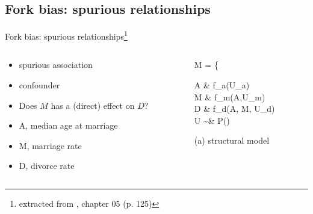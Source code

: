 \subsection{Fork bias: spurious relationships}
%
%
\begin{frame}[t, negative]
	\subsectionpage
\end{frame}
%
%
\begin{frame}
	{Fork bias: spurious relationships\footnote{extracted from \citet{McElreath_2020}, chapter 05 (p. 125)}}
	\begin{columns}
		\begin{column}{0.5\textwidth}
			\begin{itemize}
				\item spurious association
				\item confounder
			\end{itemize}
			\begin{itemize}
				\item Does $M$ has a (direct) effect on $D$?
			\end{itemize}
			\begin{itemize}
				\item A, median age at marriage
				\item M, marriage rate
				\item D, divorce rate
			\end{itemize}
		\end{column}
		\begin{column}{0.5\textwidth}  
			\begin{equ}
				M = \left\{ \begin{aligned} 
					A \leftarrow & \; f_{a}(U_{a}) \\
					M \leftarrow & \; f_{m}(A,U_{m}) \\
					D \leftarrow & \; f_{d}(A, M, U_{d}) \\
					U \sim & \; P()
				\end{aligned} \right
				\caption*{(a) structural model}
			\end{equ}
			\begin{figure}
\end{figure}
\end{column}
\end{columns}
\end{frame}
